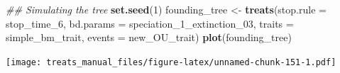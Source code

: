\documentclass[
]{book}
\newenvironment{Shaded}{\begin{snugshade}}{\end{snugshade}}
\newcommand{\CommentTok}[1]{\textcolor[rgb]{0.56,0.35,0.01}{\textit{#1}}}
\newcommand{\DataTypeTok}[1]{\textcolor[rgb]{0.13,0.29,0.53}{#1}}
\newcommand{\DecValTok}[1]{\textcolor[rgb]{0.00,0.00,0.81}{#1}}
\newcommand{\KeywordTok}[1]{\textcolor[rgb]{0.13,0.29,0.53}{\textbf{#1}}}
\newcommand{\NormalTok}[1]{#1}
\newcommand{\StringTok}[1]{\textcolor[rgb]{0.31,0.60,0.02}{#1}}
\begin{document}
\begin{Shaded}
\begin{Highlighting}[]
\CommentTok{\#\# Simulating the tree}
\KeywordTok{set.seed}\NormalTok{(}\DecValTok{1}\NormalTok{)}
\NormalTok{founding\_tree \textless{}{-}}\StringTok{ }\KeywordTok{treats}\NormalTok{(}\DataTypeTok{stop.rule =}\NormalTok{ stop\_time\_}\DecValTok{6}\NormalTok{,}
                      \DataTypeTok{bd.params =}\NormalTok{ speciation\_}\DecValTok{1}\NormalTok{\_extinction\_}\DecValTok{03}\NormalTok{,}
                      \DataTypeTok{traits =}\NormalTok{ simple\_bm\_trait,}
                      \DataTypeTok{events =}\NormalTok{ new\_OU\_trait)}
\KeywordTok{plot}\NormalTok{(founding\_tree)}
\end{Highlighting}
\end{Shaded}

\texttt{[image: treats\_manual\_files/figure-latex/unnamed-chunk-151-1.pdf]}

  
\end{document}
